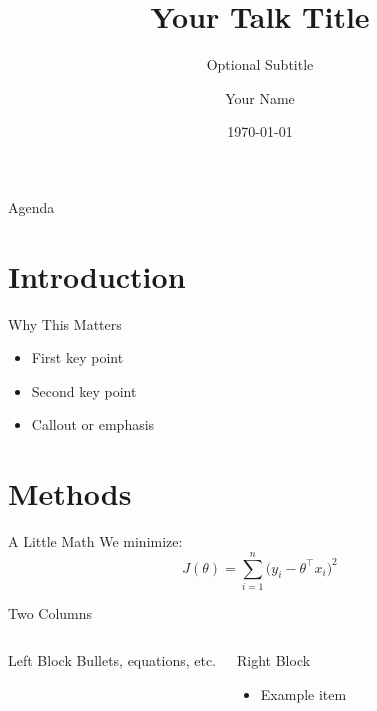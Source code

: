 \documentclass[aspectratio=169,11pt]{beamer}
\title[Short Title]{Your Talk Title}
\subtitle{Optional Subtitle}
\author{Your Name}
\institute{Your Organization}
\date{\today}
\begin{document}
\begin{frame}
  \titlepage
\end{frame}

\begin{frame}{Agenda}
  \tableofcontents
\end{frame}

\section{Introduction}
\begin{frame}{Why This Matters}
  \begin{itemize}
    \item First key point
    \item Second key point \pause
    \item \alert{Callout or emphasis}
  \end{itemize}
\end{frame}

\section{Methods}
\begin{frame}{A Little Math}
  We minimize:
  \[
    J(\theta)=\sum_{i=1}^{n}\big(y_i - \theta^\top x_i\big)^2
  \]
\end{frame}

\begin{frame}{Two Columns}
  \begin{columns}[T,totalwidth=\textwidth]
      \begin{block}{Left Block}
        Bullets, equations, etc.
      \end{block}
      \begin{exampleblock}{Right Block}
        \begin{itemize}
          \item Example item
        \end{itemize}
      \end{exampleblock}
  \end{columns}
\end{frame}
\end{document}
